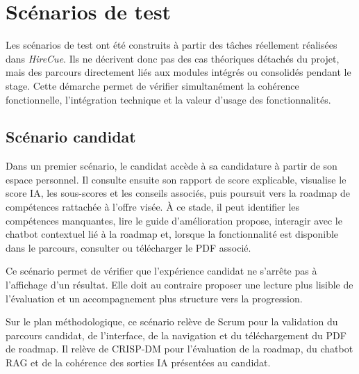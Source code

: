 \section{Scénarios de test}

Les scénarios de test ont été construits à partir des tâches réellement réalisées dans \textit{HireCue}. Ils ne décrivent donc pas des cas théoriques détachés du projet, mais des parcours directement liés aux modules intégrés ou consolidés pendant le stage. Cette démarche permet de vérifier simultanément la cohérence fonctionnelle, l'intégration technique et la valeur d'usage des fonctionnalités.

\subsection{Scénario candidat}

Dans un premier scénario, le candidat accède à sa candidature à partir de son espace personnel. Il consulte ensuite son rapport de score explicable, visualise le score IA, les sous-scores et les conseils associés, puis poursuit vers la roadmap de compétences rattachée à l'offre visée. À ce stade, il peut identifier les compétences manquantes, lire le guide d'amélioration propose, interagir avec le chatbot contextuel lié à la roadmap et, lorsque la fonctionnalité est disponible dans le parcours, consulter ou télécharger le PDF associé.

Ce scénario permet de vérifier que l'expérience candidat ne s'arrête pas à l'affichage d'un résultat. Elle doit au contraire proposer une lecture plus lisible de l'évaluation et un accompagnement plus structure vers la progression.

Sur le plan méthodologique, ce scénario relève de Scrum pour la validation du parcours candidat, de l'interface, de la navigation et du téléchargement du PDF de roadmap. Il relève de CRISP-DM pour l'évaluation de la roadmap, du chatbot RAG et de la cohérence des sorties IA présentées au candidat.

